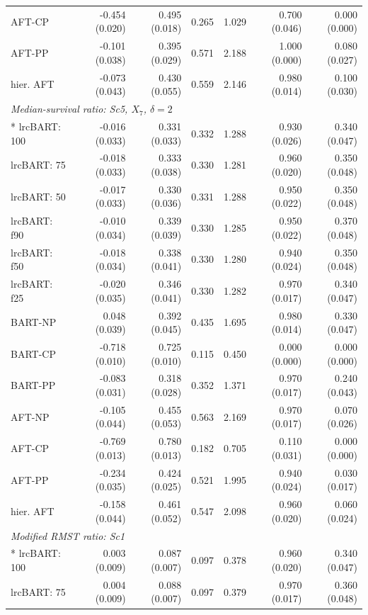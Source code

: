\begin{landscape}
\begin{longtable}{lrrrrrr}
AFT-CP & -0.454 (0.020) & 0.495 (0.018) & 0.265 & 1.029 & 0.700 (0.046) & 0.000 (0.000) \\
AFT-PP & -0.101 (0.038) & 0.395 (0.029) & 0.571 & 2.188 & 1.000 (0.000) & 0.080 (0.027) \\
hier. AFT & -0.073 (0.043) & 0.430 (0.055) & 0.559 & 2.146 & 0.980 (0.014) & 0.100 (0.030) \\
\multicolumn{7}{l}{\strut\textit{Median-survival ratio: Sc5, $X_7$, $\delta=2$}}\\*
lrcBART: 100 & -0.016 (0.033) & 0.331 (0.033) & 0.332 & 1.288 & 0.930 (0.026) & 0.340 (0.047) \\
lrcBART: 75 & -0.018 (0.033) & 0.333 (0.038) & 0.330 & 1.281 & 0.960 (0.020) & 0.350 (0.048) \\
lrcBART: 50 & -0.017 (0.033) & 0.330 (0.036) & 0.331 & 1.288 & 0.950 (0.022) & 0.350 (0.048) \\
lrcBART: f90 & -0.010 (0.034) & 0.339 (0.039) & 0.330 & 1.285 & 0.950 (0.022) & 0.370 (0.048) \\
lrcBART: f50 & -0.018 (0.034) & 0.338 (0.041) & 0.330 & 1.280 & 0.940 (0.024) & 0.350 (0.048) \\
lrcBART: f25 & -0.020 (0.035) & 0.346 (0.041) & 0.330 & 1.282 & 0.970 (0.017) & 0.340 (0.047) \\
BART-NP & 0.048 (0.039) & 0.392 (0.045) & 0.435 & 1.695 & 0.980 (0.014) & 0.330 (0.047) \\
BART-CP & -0.718 (0.010) & 0.725 (0.010) & 0.115 & 0.450 & 0.000 (0.000) & 0.000 (0.000) \\
BART-PP & -0.083 (0.031) & 0.318 (0.028) & 0.352 & 1.371 & 0.970 (0.017) & 0.240 (0.043) \\
AFT-NP & -0.105 (0.044) & 0.455 (0.053) & 0.563 & 2.169 & 0.970 (0.017) & 0.070 (0.026) \\
AFT-CP & -0.769 (0.013) & 0.780 (0.013) & 0.182 & 0.705 & 0.110 (0.031) & 0.000 (0.000) \\
AFT-PP & -0.234 (0.035) & 0.424 (0.025) & 0.521 & 1.995 & 0.940 (0.024) & 0.030 (0.017) \\
hier. AFT & -0.158 (0.044) & 0.461 (0.052) & 0.547 & 2.098 & 0.960 (0.020) & 0.060 (0.024) \\
\multicolumn{7}{l}{\strut\textit{Modified RMST ratio: Sc1}}\\*
lrcBART: 100 & 0.003 (0.009) & 0.087 (0.007) & 0.097 & 0.378 & 0.960 (0.020) & 0.340 (0.047) \\
lrcBART: 75 & 0.004 (0.009) & 0.088 (0.007) & 0.097 & 0.379 & 0.970 (0.017) & 0.360 (0.048) \\

\end{longtable}
\end{landscape}
